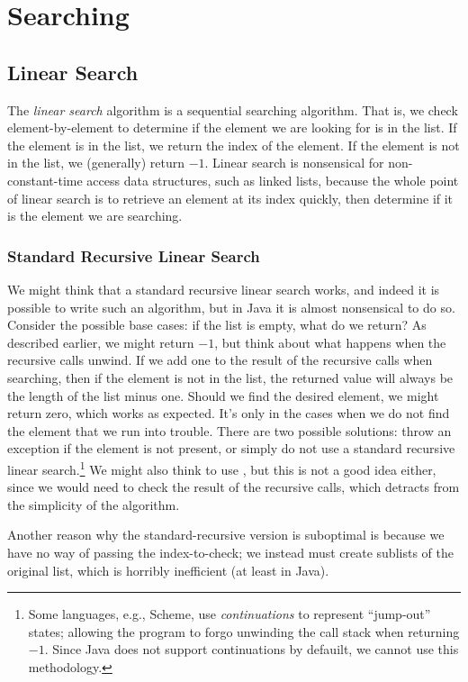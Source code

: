 \section{Searching}

\subsection*{Linear Search}
The \textit{linear search} algorithm is a sequential searching algorithm. That is, we check element-by-element to determine if the element we are looking for is in the list. If the element is in the list, we return the index of the element. If the element is not in the list, we (generally) return $-1$. Linear search is nonsensical for non-constant-time access data structures, such as linked lists, because the whole point of linear search is to retrieve an element at its index quickly, then determine if it is the element we are searching. 

\subsubsection*{Standard Recursive Linear Search}
We might think that a standard recursive linear search works, and indeed it is possible to write such an algorithm, but in Java it is almost nonsensical to do so. Consider the possible base cases: if the list is empty, what do we return? As described earlier, we might return $-1$, but think about what happens when the recursive calls unwind. If we add one to the result of the recursive calls when searching, then if the element is not in the list, the returned value will always be the length of the list minus one. Should we find the desired element, we might return zero, which works as expected. It's only in the cases when we do not find the element that we run into trouble. There are two possible solutions: throw an exception if the element is not present, or simply do not use a standard recursive linear search.\footnote{Some languages, e.g., Scheme, use \textit{continuations} to represent ``jump-out'' states; allowing the program to forgo unwinding the call stack when returning $-1$. Since Java does not support continuations by defauilt, we cannot use this methodology.} We might also think to use , but this is not a good idea either, since we would need to check the result of the recursive calls, which detracts from the simplicity of the algorithm.

Another reason why the standard-recursive version is suboptimal is because we have no way of passing the index-to-check; we instead must create sublists of the original list, which is horribly inefficient (at least in Java).

